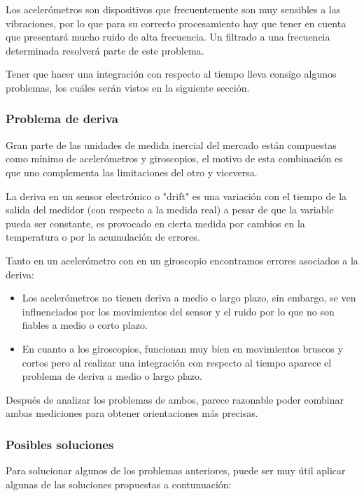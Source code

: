 Los acelerómetros son dispositivos que frecuentemente son muy sensibles a las vibraciones, por lo que para su correcto procesamiento hay que tener en cuenta que presentará mucho ruido de alta frecuencia. Un filtrado a una frecuencia determinada resolverá parte de este problema.\newline

Tener que hacer una integración con respecto al tiempo lleva consigo algunos problemas, los cuáles serán vistos en la siguiente sección. 

\subsubsection{Problema de deriva}

Gran parte de las unidades de medida inercial del mercado están compuestas como mínimo de acelerómetros y giroscopios, el motivo de esta combinación es que uno complementa las limitaciones del otro y viceversa. \newline

La deriva en un sensor electrónico o "drift" es una variación con el tiempo de la salida del medidor (con respecto a la medida real) a pesar de que la variable pueda ser constante, es provocado en cierta medida por cambios en la temperatura o por la acumulación de errores. \newline

Tanto en un acelerómetro con en un giroscopio encontramos errores asociados a la deriva: 
\begin{itemize}
	\item Los acelerómetros no tienen deriva a medio o largo plazo, sin embargo, se ven influenciados por los movimientos del sensor y el ruido por lo que no son fiables a medio o corto plazo.
	\item En cuanto a los giroscopios, funcionan muy bien en movimientos bruscos y cortos pero al realizar una integración con respecto al tiempo aparece el problema de deriva a medio o largo plazo. 
\end{itemize} 

Después de analizar los problemas de ambos, parece razonable poder combinar ambas mediciones para obtener orientaciones más precisas. 

\subsubsection{Posibles soluciones}

Para solucionar algunos de los problemas anteriores, puede ser muy útil aplicar algunas de las soluciones propuestas a contunuación: 

